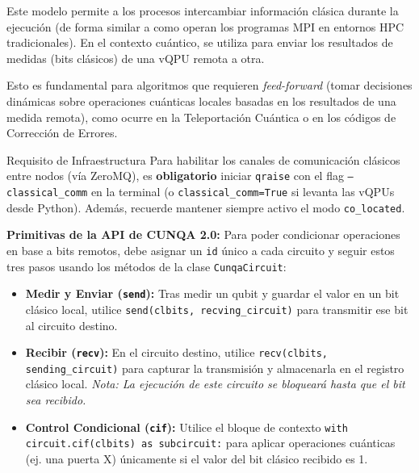 \documentclass[a4paper,11pt]{article}
\begin{document}
Este modelo permite a los procesos intercambiar información clásica durante la ejecución (de forma similar a como operan los programas MPI en entornos HPC tradicionales). En el contexto cuántico, se utiliza para enviar los resultados de medidas (bits clásicos) de una vQPU remota a otra. 

Esto es fundamental para algoritmos que requieren \textit{feed-forward} (tomar decisiones dinámicas sobre operaciones cuánticas locales basadas en los resultados de una medida remota), como ocurre en la Teleportación Cuántica o en los códigos de Corrección de Errores.

\begin{infobox}{Requisito de Infraestructura}
Para habilitar los canales de comunicación clásicos entre nodos (vía ZeroMQ), es \textbf{obligatorio} iniciar \texttt{qraise} con el flag \texttt{--classical\_comm} en la terminal (o \texttt{classical\_comm=True} si levanta las vQPUs desde Python). Además, recuerde mantener siempre activo el modo \texttt{co\_located}.
\end{infobox}

\textbf{Primitivas de la API de CUNQA 2.0:}
Para poder condicionar operaciones en base a bits remotos, debe asignar un \texttt{id} único a cada circuito y seguir estos tres pasos usando los métodos de la clase \texttt{CunqaCircuit}:

\begin{itemize}
    \item \textbf{Medir y Enviar (\texttt{send}):} Tras medir un qubit y guardar el valor en un bit clásico local, utilice \texttt{send(clbits, recving\_circuit)} para transmitir ese bit al circuito destino.
    \item \textbf{Recibir (\texttt{recv}):} En el circuito destino, utilice \texttt{recv(clbits, sending\_circuit)} para capturar la transmisión y almacenarla en el registro clásico local. \textit{Nota: La ejecución de este circuito se bloqueará hasta que el bit sea recibido.}
    \item \textbf{Control Condicional (\texttt{cif}):} Utilice el bloque de contexto \texttt{with circuit.cif(clbits) as subcircuit:} para aplicar operaciones cuánticas (ej. una puerta X) únicamente si el valor del bit clásico recibido es 1.
\end{itemize}
\end{document}
